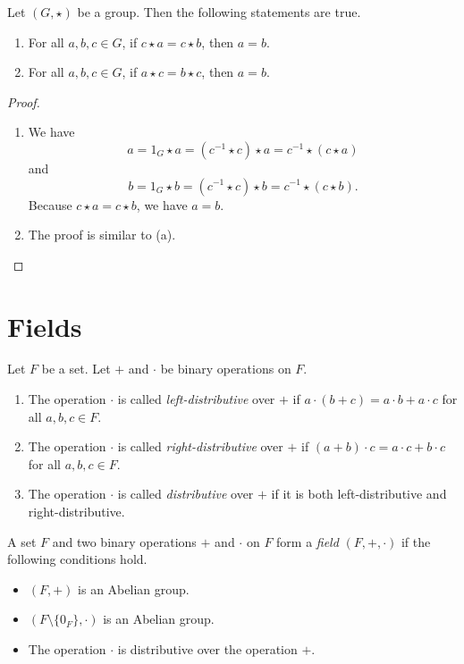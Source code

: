 \begin{theorem}\label{thm:group-cancel}
  Let $(G, \star)$ be a group. Then the following statements are true.
  \begin{enumerate}
    \item For all $a, b, c \in G$, if $c \star a = c \star b$, then $a = b$.
    \item For all $a, b, c \in G$, if $a \star c = b \star c$, then $a = b$.
  \end{enumerate}
\end{theorem}
\begin{proof} \leavevmode
  \begin{enumerate}
    \item We have
      $$
      a = 1_G \star a = (c^{-1} \star c) \star a = c^{-1} \star (c \star a)
      $$
      and
      $$
      b = 1_G \star b = (c^{-1} \star c) \star b = c^{-1} \star (c \star b).
      $$
      Because $c \star a = c \star b$, we have $a = b$.
    \item The proof is similar to (a). \qedhere
  \end{enumerate}
\end{proof}

\section{Fields}
\begin{definition}\label{def:distributivity}
  Let $F$ be a set. Let $+$ and $\cdot$ be binary operations on $F$.
  \begin{enumerate}
    \item The operation $\cdot$ is called \emph{left-distributive} over $+$
      if $a \cdot (b + c) = a \cdot b + a \cdot c$ for all $a, b, c \in F$.
    \item The operation $\cdot$ is called \emph{right-distributive} over $+$
      if $(a + b) \cdot c = a \cdot c + b \cdot c$ for all $a, b, c \in F$.
    \item The operation $\cdot$ is called \emph{distributive} over $+$
      if it is both left-distributive and right-distributive.
  \end{enumerate}
\end{definition}

\begin{definition}\label{def:field}
  A set $F$ and two binary operations $+$ and $\cdot$ on $F$ form a
  \emph{field} $(F, +, \cdot)$ if the following conditions hold.
  \begin{itemize}
    \item $(F, +)$ is an Abelian group.
    \item $(F \setminus \{0_F\}, \cdot)$ is an Abelian group.
    \item The operation $\cdot$ is distributive over the operation $+$.
  \end{itemize}
\end{definition}

